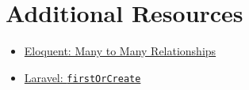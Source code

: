 


\section{Additional Resources}

\begin{itemize}[leftmargin=*]
    \item \href{http://laravel.com/docs/master/eloquent-relationships#many-to-many}{Eloquent: Many to Many Relationships}
    \item \href{http://laravel.com/docs/master/eloquent#other-creation-methods}{Laravel: \texttt{firstOrCreate}}
\end{itemize}
